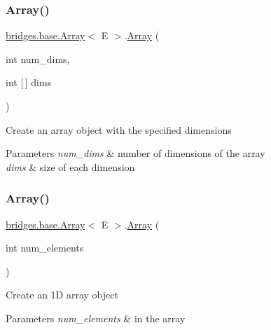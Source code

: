 \subsubsection{\texorpdfstring{Array()}{Array()}\hspace{0.1cm}{\footnotesize\ttfamily [2/5]}}
{\footnotesize\ttfamily \mbox{\hyperlink{classbridges_1_1base_1_1_array}{bridges.\+base.\+Array}}$<$ E $>$.\mbox{\hyperlink{classbridges_1_1base_1_1_array}{Array}} (\begin{DoxyParamCaption}\item[{int}]{num\+\_\+dims,  }\item[{int \mbox{[}$\,$\mbox{]}}]{dims }\end{DoxyParamCaption})}

Create an array object with the specified dimensions


\begin{DoxyParams}{Parameters}
{\em num\+\_\+dims} & number of dimensions of the array \\
\hline
{\em dims} & size of each dimension \\
\hline
\end{DoxyParams}
\mbox{\label{classbridges_1_1base_1_1_array_acd4d14ab49b5d17ec2fb7a9234d31b4f}} 
\subsubsection{\texorpdfstring{Array()}{Array()}\hspace{0.1cm}{\footnotesize\ttfamily [3/5]}}
{\footnotesize\ttfamily \mbox{\hyperlink{classbridges_1_1base_1_1_array}{bridges.\+base.\+Array}}$<$ E $>$.\mbox{\hyperlink{classbridges_1_1base_1_1_array}{Array}} (\begin{DoxyParamCaption}\item[{int}]{num\+\_\+elements }\end{DoxyParamCaption})}

Create an 1D array object


\begin{DoxyParams}{Parameters}
{\em num\+\_\+elements} & in the array \\
\hline
\end{DoxyParams}
\mbox{\label{classbridges_1_1base_1_1_array_a2bdb4561fdbe033328db9febf636c23b}} 
